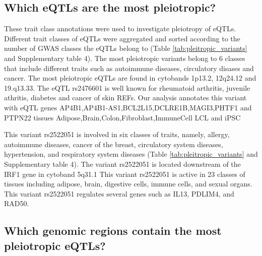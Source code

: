 %
\subsection*{Which eQTLs are the most pleiotropic?}
%

These trait class annotations were used to investigate pleiotropy of eQTLs.
%
Different trait classes of eQTLs were aggregated and sorted according to the number of GWAS classes the eQTLs belong to (Table \ref{tab:pleitropic_variants} and Supplementary table 4).
%
The most pleiotropic variants belong to 6 classes that include different traits such as autoimmune diseases, circulatory disases and cancer.
%
The most pleiotropic eQTLs are found in cytobands 1p13.2, 12q24.12 and 19.q13.33.
%
The eQTL rs2476601 is well known for rheumatoid arthritis, juvenile athritis, diabetes and cancer of skin REFs.
%
Our analysis annotates this variant with eQTL genes AP4B1,AP4B1-AS1,BCL2L15,DCLRE1B,MAGI3,PHTF1 and PTPN22 tissues Adipose,Brain,Colon,Fibroblast,ImmuneCell LCL and iPSC

This variant rs2522051 is involved in six classes of traits, namely,
allergy, autoimmune diseases, cancer of the breast, circulatory system diseases, hypertension, and respiratory system diseases
(Table \ref{tab:pleitropic_variants} and Supplementary table 4).
%
The variant rs2522051 is located downstream of the IRF1 gene in cytoband 5q31.1
%
This variant rs2522051 is active in 23 classes of tissues including adipose, brain, digestive cells, immune cells, and sexual organs.
%
This variant rs2522051 regulates several genes such as IL13, PDLIM4, and RAD50.

%
\subsection*{Which genomic regions contain the most pleiotropic eQTLs?}
%

